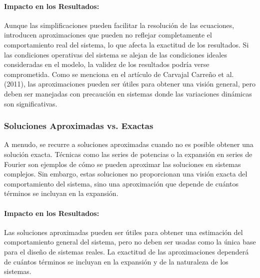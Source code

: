 \paragraph*{Impacto en los Resultados:}
Aunque las simplificaciones pueden facilitar la resolución de las ecuaciones,
introducen aproximaciones que pueden no reflejar completamente el comportamiento
real del sistema, lo que afecta la exactitud de los resultados. Si las condiciones
operativas del sistema se alejan de las condiciones ideales consideradas en el modelo,
la validez de los resultados podría verse comprometida. Como se menciona en el
artículo de Carvajal Carreño et al. (2011), las aproximaciones pueden ser útiles para
obtener una visión general, pero deben ser manejadas con precaución en sistemas
donde las variaciones dinámicas son significativas.

\subsubsection*{Soluciones Aproximadas vs. Exactas}
A menudo, se recurre a soluciones aproximadas cuando no es posible obtener una solución
exacta. Técnicas como las series de potencias o la expansión en series de Fourier son
ejemplos de cómo se pueden aproximar las soluciones en sistemas complejos. Sin embargo,
estas soluciones no proporcionan una visión exacta del comportamiento del sistema, sino una
aproximación que depende de cuántos términos se incluyan en la expansión.

\paragraph*{Impacto en los Resultados:}
Las soluciones aproximadas pueden ser útiles para obtener una estimación del
comportamiento general del sistema, pero no deben ser usadas como la única base
para el diseño de sistemas reales. La exactitud de las aproximaciones dependerá de
cuántos términos se incluyan en la expansión y de la naturaleza de los sistemas.